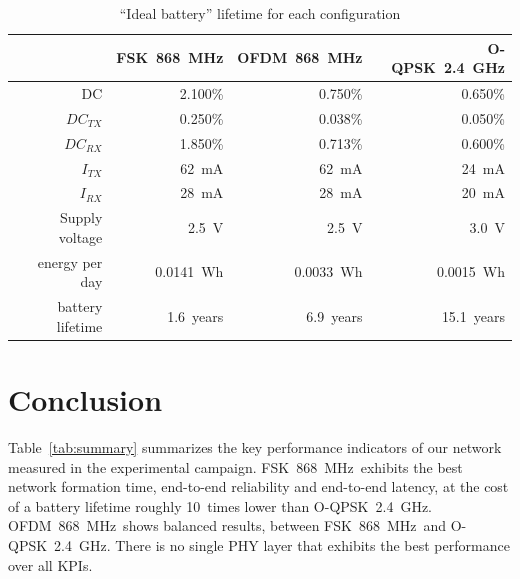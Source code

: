\documentclass[sensors,article,submit,moreauthors,pdftex]{Definitions/mdpi}
\newcommand{\fsk}           {FSK~868~MHz}
\newcommand{\oqpsk}         {O-QPSK~2.4~GHz}
\newcommand{\ofdm}          {OFDM~868~MHz}
\begin{document}
\begin{table}[ht]
    \centering
    \caption{``Ideal battery'' lifetime for each configuration}
    \begin{tabular}{|r|r|r|r|}
    \hline
                          &      \fsk &     \ofdm &     \oqpsk \\ \hline
        DC                &   2.100\% &   0.750\% &    0.650\% \\ \hline
        $DC_{TX}$         &   0.250\% &   0.038\% &    0.050\% \\ \hline
        $DC_{RX}$         &   1.850\% &   0.713\% &    0.600\% \\ \hline
        $I_{TX}$          &     62~mA &     62~mA &      24~mA \\ \hline
        $I_{RX}$          &     28~mA &     28~mA &      20~mA \\ \hline
        Supply voltage    &     2.5~V &     2.5~V &      3.0~V \\ \hline
        energy per day    & 0.0141~Wh & 0.0033~Wh &  0.0015~Wh \\ \hline
        battery lifetime  & 1.6~years & 6.9~years & 15.1~years \\ \hline
        \end{tabular}
    \label{tab:energy_table}
\end{table}

\section{Conclusion}
\label{sec:conclusion}


Table~\ref{tab:summary} summarizes the key performance indicators of our network measured in the experimental campaign.
\fsk\ exhibits the best network formation time, end-to-end reliability and end-to-end latency,
    at the cost of a battery lifetime roughly 10~times lower than \oqpsk.
\ofdm\ shows balanced results, between \fsk\ and \oqpsk.
There is no single PHY layer that exhibits the best performance over all KPIs.
\end{document}
